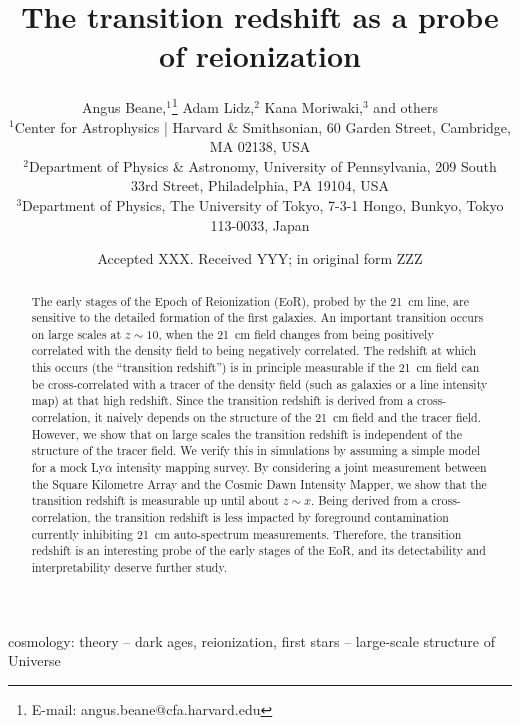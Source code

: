 \documentclass[a4paper,fleqn,usenatbib]{mnras}
\title[The transition redshift as an EoR probe]{The transition redshift as a probe of reionization}
\author[A. Beane et al.]{
Angus Beane,$^{1}$\thanks{E-mail: angus.beane@cfa.harvard.edu}
Adam Lidz,$^{2}$
Kana Moriwaki,$^{3}$
and others
\\
$^{1}$Center for Astrophysics {\normalfont |} Harvard \& Smithsonian, 60 Garden Street, Cambridge, MA 02138, USA\\
$^{2}$Department of Physics \& Astronomy, University of Pennsylvania, 209 South 33rd Street, Philadelphia, PA 19104, USA\\
$^{3}$Department of Physics, The University of Tokyo, 7-3-1 Hongo, Bunkyo, Tokyo 113-0033, Japan
}
\date{Accepted XXX. Received YYY; in original form ZZZ}
\begin{document}
\label{firstpage}
\pagerange{\pageref{firstpage}--\pageref{lastpage}}
\maketitle

\begin{abstract}
The early stages of the Epoch of Reionization (EoR), probed by the 21~cm line,
are sensitive to the detailed formation of the first galaxies. An important
transition occurs on large scales at $z\sim10$, when the 21~cm field changes
from being positively correlated with the density field to being negatively
correlated. The redshift at which this occurs (the ``transition redshift'') is
in principle measurable if the 21~cm field can be cross-correlated with a
tracer of the density field (such as galaxies or a line intensity map) at that
high redshift. Since the transition redshift is derived from a
cross-correlation, it naively depends on the structure of the 21~cm field and
the tracer field. However, we show that on large scales the transition
redshift is independent of the structure of the tracer field. We verify this
in simulations by assuming a simple model for a mock Ly$\alpha$ intensity
mapping survey. By considering a joint measurement between the Square
Kilometre Array and the Cosmic Dawn Intensity Mapper, we show that the
transition redshift is measurable up until about $z\sim x$. Being derived from
a cross-correlation, the transition redshift is less impacted by foreground
contamination currently inhibiting 21~cm auto-spectrum measurements.
Therefore, the transition redshift is an interesting probe of the early stages
of the EoR, and its detectability and interpretability deserve further study.
\end{abstract}

\begin{keywords}
cosmology: theory -- dark ages, reionization, first stars -- large-scale
structure of Universe
\end{keywords}


\end{document}

